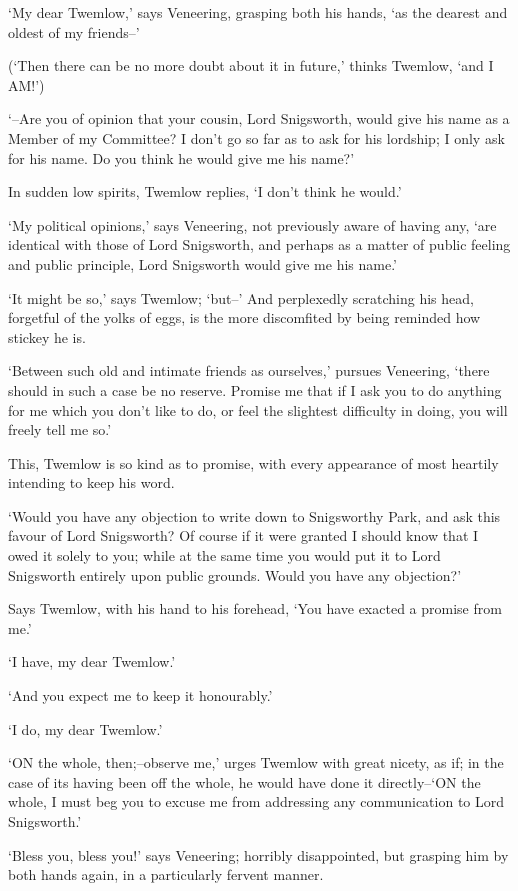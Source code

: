 ‘My dear Twemlow,’ says Veneering, grasping both his hands, ‘as the
dearest and oldest of my friends--’

(‘Then there can be no more doubt about it in future,’ thinks Twemlow,
‘and I AM!’)

‘--Are you of opinion that your cousin, Lord Snigsworth, would give his
name as a Member of my Committee? I don’t go so far as to ask for his
lordship; I only ask for his name. Do you think he would give me his
name?’

In sudden low spirits, Twemlow replies, ‘I don’t think he would.’

‘My political opinions,’ says Veneering, not previously aware of having
any, ‘are identical with those of Lord Snigsworth, and perhaps as a
matter of public feeling and public principle, Lord Snigsworth would
give me his name.’

‘It might be so,’ says Twemlow; ‘but--’ And perplexedly scratching his
head, forgetful of the yolks of eggs, is the more discomfited by being
reminded how stickey he is.

‘Between such old and intimate friends as ourselves,’ pursues Veneering,
‘there should in such a case be no reserve. Promise me that if I ask you
to do anything for me which you don’t like to do, or feel the slightest
difficulty in doing, you will freely tell me so.’

This, Twemlow is so kind as to promise, with every appearance of most
heartily intending to keep his word.

‘Would you have any objection to write down to Snigsworthy Park, and ask
this favour of Lord Snigsworth? Of course if it were granted I should
know that I owed it solely to you; while at the same time you would put
it to Lord Snigsworth entirely upon public grounds. Would you have any
objection?’

Says Twemlow, with his hand to his forehead, ‘You have exacted a promise
from me.’

‘I have, my dear Twemlow.’

‘And you expect me to keep it honourably.’

‘I do, my dear Twemlow.’

‘ON the whole, then;--observe me,’ urges Twemlow with great nicety, as
if; in the case of its having been off the whole, he would have done it
directly--‘ON the whole, I must beg you to excuse me from addressing any
communication to Lord Snigsworth.’

‘Bless you, bless you!’ says Veneering; horribly disappointed, but
grasping him by both hands again, in a particularly fervent manner.

